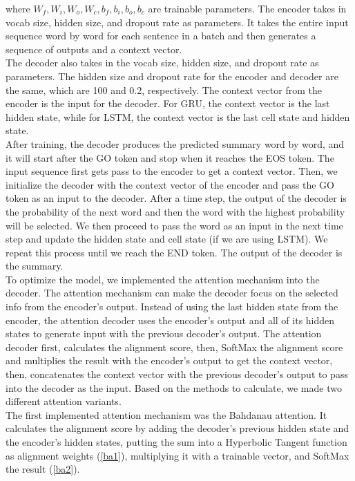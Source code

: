 \documentclass[conference]{IEEEtran}
\begin{document}
where $W_f, W_i, W_o, W_c, b_f, b_i, b_o, b_c$ are trainable parameters.
\indent The encoder takes in vocab size, hidden size, and dropout rate as parameters. It takes the entire input sequence word by word for each sentence in a batch and then generates a sequence of outputs and a context vector. \\
\indent The decoder also takes in the vocab size, hidden size, and dropout rate as parameters. The hidden size and dropout rate for the encoder and decoder are the same, which are 100 and 0.2, respectively. The context vector from the encoder is the input for the decoder. For GRU, the context vector is the last hidden state, while for LSTM, the context vector is the last cell state and hidden state. \\
\indent After training, the decoder produces the predicted summary word by word, and it will start after the GO token and stop when it reaches the EOS token. The input sequence first gets pass to the encoder to get a context vector. Then, we initialize the decoder with the context vector of the encoder and pass the GO token as an input to the decoder. After a time step, the output of the decoder is the probability of the next word and then the word with the highest probability will be selected. We then proceed to pass the word as an input in the next time step and update the hidden state and cell state (if we are using LSTM). We repeat this process until we reach the END token. The output of the decoder is the summary. \\
\indent To optimize the model, we implemented the attention mechanism into the decoder. The attention mechanism can make the decoder focus on the selected info from the encoder’s output. Instead of using the last hidden state from the encoder, the attention decoder uses the encoder’s output and all of its hidden states to generate input with the previous decoder’s output. The attention decoder first, calculates the alignment score, then, SoftMax the alignment score and multiplies the result with the encoder’s output to get the context vector, then, concatenates the context vector with the previous decoder’s output to pass into the decoder as the input. Based on the methods to calculate, we made two different attention variants. \\
\indent The first implemented attention mechanism was the Bahdanau attention. It calculates the alignment score by adding the decoder’s previous hidden state and the encoder’s hidden states, putting the sum into a Hyperbolic Tangent function as alignment weights (\ref{ba1}), multiplying it with a trainable vector, and SoftMax the result (\ref{ba2}).
\end{document}
